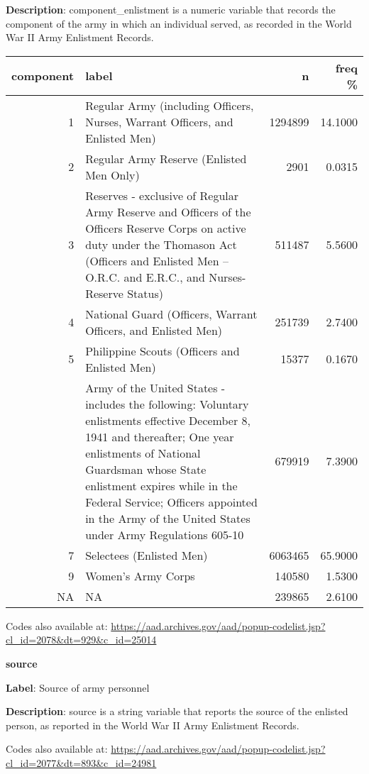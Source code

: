\documentclass[
]{article}
\begin{document}
\textbf{Description}: component\_enlistment is a numeric variable that
records the component of the army in which an individual served, as
recorded in the World War II Army Enlistment Records.

\vspace{30 pt}

\begin{table}
\centering
\begin{tabular}{r>{\raggedright\arraybackslash}p{7cm}rr}
\toprule
component & label & n & freq \%\\
\midrule
1 & Regular Army (including Officers, Nurses, Warrant Officers, and Enlisted Men) & 1294899 & 14.1000\\
2 & Regular Army Reserve (Enlisted Men Only) & 2901 & 0.0315\\
3 & Reserves - exclusive of Regular Army Reserve and Officers of the Officers Reserve Corps on active duty under the Thomason Act (Officers and Enlisted Men -- O.R.C. and E.R.C., and Nurses-Reserve Status) & 511487 & 5.5600\\
4 & National Guard (Officers, Warrant Officers, and Enlisted Men) & 251739 & 2.7400\\
5 & Philippine Scouts (Officers and Enlisted Men) & 15377 & 0.1670\\
\addlinespace
6 & Army of the United States - includes the following: Voluntary enlistments effective December 8, 1941 and thereafter; One year enlistments of National Guardsman whose State enlistment expires while in the Federal Service; Officers appointed in the Army of the United States under Army Regulations 605-10 & 679919 & 7.3900\\
7 & Selectees (Enlisted Men) & 6063465 & 65.9000\\
9 & Women's Army Corps & 140580 & 1.5300\\
NA & NA & 239865 & 2.6100\\
\bottomrule
\end{tabular}
\end{table}

Codes also available at:
\url{https://aad.archives.gov/aad/popup-codelist.jsp?cl_id=2078\&dt=929\&c_id=25014}

\newpage

\textbf{\huge source} \normalsize \vspace{12pt}

\textbf{Label}: Source of army personnel

\textbf{Description}: source is a string variable that reports the
source of the enlisted person, as reported in the World War II Army
Enlistment Records.

Codes also available at:
\url{https://aad.archives.gov/aad/popup-codelist.jsp?cl_id=2077\&dt=893\&c_id=24981}
\end{document}
